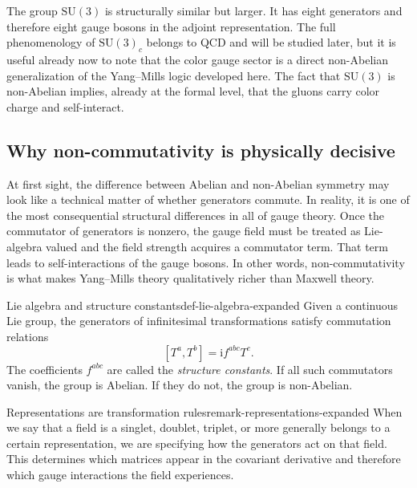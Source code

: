 \documentclass[11pt,a4paper]{article}
\newcommand{\ii}{\mathrm{i}}
\newcommand{\comm}[2]{\left[#1,#2\right]}
\newcommand{\SU}{\mathrm{SU}}
\begin{document}
The group \(\SU(3)\) is structurally similar but larger. It has eight generators and therefore eight gauge bosons in the adjoint representation. The full phenomenology of \(\SU(3)_c\) belongs to QCD and will be studied later, but it is useful already now to note that the color gauge sector is a direct non-Abelian generalization of the Yang--Mills logic developed here. The fact that \(\SU(3)\) is non-Abelian implies, already at the formal level, that the gluons carry color charge and self-interact.



\subsection{Why non-commutativity is physically decisive}

At first sight, the difference between Abelian and non-Abelian symmetry may look like a technical matter of whether generators commute. In reality, it is one of the most consequential structural differences in all of gauge theory. Once the commutator of generators is nonzero, the gauge field must be treated as Lie-algebra valued and the field strength acquires a commutator term. That term leads to self-interactions of the gauge bosons. In other words, non-commutativity is what makes Yang--Mills theory qualitatively richer than Maxwell theory.

\begin{definition}{Lie algebra and structure constants}{def-lie-algebra-expanded}
Given a continuous Lie group, the generators of infinitesimal transformations satisfy commutation relations
\[
\comm{T^a}{T^b}=\ii f^{abc}T^c.
\]
The coefficients \(f^{abc}\) are called the \emph{structure constants}. If all such commutators vanish, the group is Abelian. If they do not, the group is non-Abelian.
\end{definition}


\begin{remarkbox}{Representations are transformation rules}{remark-representations-expanded}
When we say that a field is a singlet, doublet, triplet, or more generally belongs to a certain representation, we are specifying how the generators act on that field. This determines which matrices appear in the covariant derivative and therefore which gauge interactions the field experiences.
\end{remarkbox}
\end{document}
